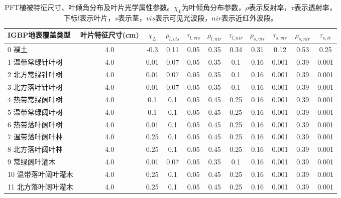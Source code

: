 \begin{sidewaystable}[]
    \centering
    \caption{PFT植被特征尺寸、叶倾角分布及叶片光学属性参数。$\chi_L$为叶倾角分布参数，$\rho$表示反射率，$\tau$表示透射率，下标$l$表示叶片，$s$表示茎，$vis$表示可见光波段，$nir$表示近红外波段。}
    \label{tab:PFT植被特征尺寸叶倾角分布及叶片光学属性参数1}
        \begin{tabular}{@{}lcccccccccc@{}}
        \toprule
        IGBP地表覆盖类型   & 叶片特征尺寸(cm) & $\chi_L$ &$\rho_{l, vis}$ & $\tau_{l, v i s}$  &$\rho_{l,  nir}$ &$\tau_{l,  nir}$ & $\rho_{s, v i s}$ &$\tau_{s, v i s}$ &$\rho_{s,  nir}$ &$\tau_{s,ir}$\\ \midrule
        0 裸土           & 4.0        & -0.3 & 0.11 & 0.05 & 0.35 & 0.34 & 0.31 & 0.12  & 0.53 & 0.25  \\
        1 温带常绿针叶树   & 4.0        & 0.01 & 0.07 & 0.05 & 0.35 & 0.1  & 0.16 & 0.001 & 0.39 & 0.001 \\
        2 北方常绿针叶树   & 4.0        & 0.01 & 0.07 & 0.05 & 0.35 & 0.1  & 0.16 & 0.001 & 0.39 & 0.001 \\
        3 北方落叶针叶树   & 4.0        & 0.01 & 0.07 & 0.05 & 0.35 & 0.1  & 0.16 & 0.001 & 0.39 & 0.001 \\
        4 热带常绿阔叶树   & 4.0        & 0.1  & 0.1  & 0.05 & 0.45 & 0.25 & 0.16 & 0.001 & 0.39 & 0.001 \\
        5 温带常绿阔叶树   & 4.0        & 0.1  & 0.1  & 0.05 & 0.45 & 0.25 & 0.16 & 0.001 & 0.39 & 0.001 \\
        6 热带落叶阔叶树   & 4.0        & 0.01 & 0.1  & 0.05 & 0.45 & 0.25 & 0.16 & 0.001 & 0.39 & 0.001 \\
        7 温带落叶阔叶林   & 4.0        & 0.25 & 0.1  & 0.05 & 0.45 & 0.25 & 0.16 & 0.001 & 0.39 & 0.001 \\
        8 北方落叶阔叶林   & 4.0        & 0.25 & 0.1  & 0.05 & 0.45 & 0.25 & 0.16 & 0.001 & 0.39 & 0.001 \\
        9 常绿阔叶灌木    & 4.0        & 0.01 & 0.07 & 0.05 & 0.35 & 0.1  & 0.16 & 0.001 & 0.39 & 0.001 \\
        10 温带落叶阔叶灌木 & 4.0        & 0.25 & 0.1  & 0.05 & 0.45 & 0.25 & 0.16 & 0.001 & 0.39 & 0.001 \\
        11 北方落叶阔叶灌木 & 4.0        & 0.25 & 0.1  & 0.05 & 0.45 & 0.25 & 0.16 & 0.001 & 0.39 & 0.001 \\\bottomrule
        \end{tabular}
    \end{sidewaystable}
 

